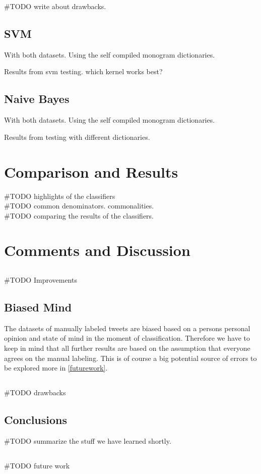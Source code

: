 #TODO write about drawbacks. 

\subsection{SVM}\label{sentiment:svm_classification}
With both datasets.
Using the self compiled monogram dictionaries. 

Results from svm testing. which kernel works best?

\subsection{Naive Bayes}\label{sentiment:naive_bayes_classification}
With both datasets.
Using the self compiled monogram dictionaries. 

Results from testing with different dictionaries. 

\section{Comparison and Results}\label{sentiment:comparison_results}
#TODO highlights of the classifiers \\
#TODO common denominators. commonalities.\\
#TODO comparing the results of the classifiers. \\

\section{Comments and Discussion}\label{sentiment:comments_discussion}

\subsection{}
#TODO Improvements \\

\subsection{Biased Mind}
The datasets of manually labeled tweets are biased based on a persons 
personal opinion and state of mind in the moment of classification.
Therefore we have to keep in mind that all further results are based on the
assumption that everyone agrees on the manual labeling. This is of course a big
potential source of errors to be explored more in \ref{futurework}. 

\subsection{}
#TODO drawbacks \\

\subsection{Conclusions}
#TODO summarize the stuff we have learned shortly. \\

\subsection{}
#TODO future work \\
